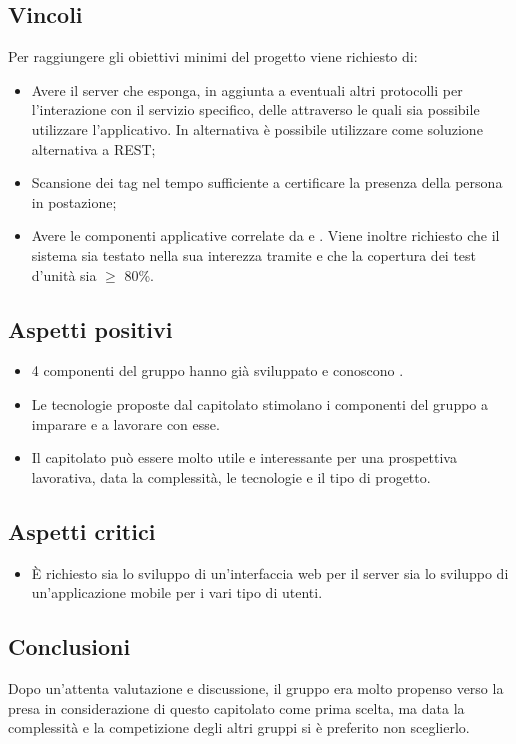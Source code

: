 \subsection{Vincoli}
Per raggiungere gli obiettivi minimi del progetto viene richiesto di:
\begin{itemize}
\item Avere il server che esponga, in aggiunta a eventuali altri protocolli per l’interazione con il servizio specifico, delle   attraverso le quali sia possibile utilizzare l'applicativo. In alternativa è possibile utilizzare  come soluzione alternativa a REST;
\item Scansione dei tag nel tempo sufficiente a certificare la presenza della persona in postazione;
\item Avere le componenti applicative correlate da  e . Viene inoltre richiesto che il sistema sia testato nella sua interezza tramite  e che la copertura dei test d'unità sia $\geq$ 80\%.
\end{itemize}

\subsection{Aspetti positivi}
\begin{itemize} 
	\item 4 componenti del gruppo hanno già sviluppato e conoscono .
	\item Le tecnologie proposte dal capitolato stimolano i componenti del gruppo a imparare e a lavorare con esse.
	\item Il capitolato può essere molto utile e interessante per una prospettiva lavorativa, data la complessità, le tecnologie e il tipo di progetto.
\end{itemize}

\subsection{Aspetti critici}
\begin{itemize}
\item È richiesto sia lo sviluppo di un'interfaccia web per il server sia lo sviluppo di un'applicazione mobile per i vari tipo di utenti.
\end{itemize}

\subsection{Conclusioni}
Dopo un'attenta valutazione e discussione, il gruppo era molto propenso verso la presa in considerazione di questo capitolato come prima scelta, ma data la complessità e la competizione degli altri gruppi si è preferito non sceglierlo.

